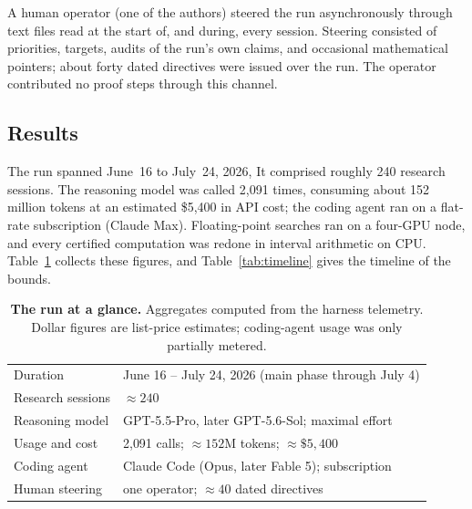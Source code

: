 A human operator (one of the authors) steered the run asynchronously through
text files read at the start of, and during, every session. Steering
consisted of priorities, targets, audits of the run's own claims, and
occasional mathematical pointers; about forty dated directives were issued
over the run. The operator contributed no proof steps through this channel.

\subsection{Results}
\label{sec:ai-results}

The run spanned June~16 to July~24, 2026, It comprised
roughly 240 research sessions. The reasoning model was called 2{,}091
times, consuming about 152 million tokens at an estimated \$5{,}400 in
API cost; the coding agent ran on a flat-rate subscription (Claude Max). Floating-point searches ran
on a four-GPU node, and every certified computation was redone in interval
arithmetic on CPU. Table~\ref{tab:run} collects these figures, and
Table~\ref{tab:timeline} gives the timeline of the bounds.

\begin{table}[t]
\centering
\small
\begin{tabular}{@{}ll@{}}
\toprule
Duration & June 16 -- July 24, 2026 (main phase through July 4)\\
Research sessions & $\approx240$\\
Reasoning model & GPT-5.5-Pro, later GPT-5.6-Sol; maximal effort\\
Usage and cost & 2{,}091 calls; $\approx152$M tokens; $\approx\$5{,}400$\\
Coding agent & Claude Code (Opus, later Fable 5); subscription\\
Human steering & one operator; $\approx40$ dated directives\\
\bottomrule
\end{tabular}
\caption{\textbf{The run at a glance.} Aggregates computed from the harness
telemetry. Dollar figures are list-price estimates; coding-agent usage was
only partially metered.
}
\label{tab:run}
\end{table}

